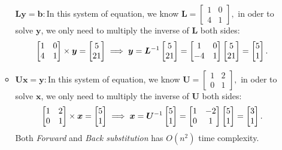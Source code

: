 \begin{enumerate}
\begin{remark}
\begin{example}
\begin{itemize}
$\bm{Ly}=\bm b:$\qquad In this system of equation, we know $\bm L=\begin{bmatrix}
1&0\\4&1
\end{bmatrix},$ in oder to solve
$\bm y$, we only need to multiply the inverse of $\bm L$ both sides:
\[
\begin{bmatrix}
1&0\\4&1
\end{bmatrix}\times\bm y=\begin{bmatrix}
5\\21
\end{bmatrix}\implies
\bm y=\bm L^{-1}\begin{bmatrix}
5\\21
\end{bmatrix}=\begin{bmatrix}
1&0\\-4&1
\end{bmatrix}\begin{bmatrix}
5\\21
\end{bmatrix}=\begin{bmatrix}
5\\1
\end{bmatrix}.
\]
\newpage
\item
$\bm{Ux}=\bm y:$\qquad In this system of equation, we know $\bm U=\begin{bmatrix}
1&2\\0&1
\end{bmatrix},$ in oder to solve
$\bm x$, we only need to multiply the inverse of $\bm U$ both sides:
\[
\begin{bmatrix}
1&2\\0&1
\end{bmatrix}\times\bm x=\begin{bmatrix}
5\\1
\end{bmatrix}\implies
\bm x=\bm U^{-1}\begin{bmatrix}
5\\1
\end{bmatrix}=\begin{bmatrix}
1&-2\\0&1
\end{bmatrix}\begin{bmatrix}
5\\1
\end{bmatrix}=\begin{bmatrix}
3\\1
\end{bmatrix}.
\]
Both \emph{Forward} and \emph{Back substitution} has $O(n^2)$ time complexity.
\end{itemize}
\end{example}
\end{remark}
\end{enumerate}
